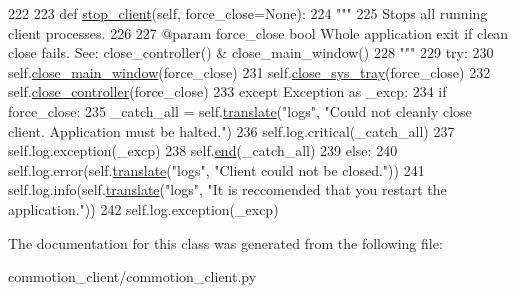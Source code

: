 \begin{DoxyCode}
222 
223     \textcolor{keyword}{def }\hyperlink{classcommotion__client_1_1commotion__client_1_1CommotionClientApplication_a63104a06ba20d9b679c22b542fd90c94}{stop\_client}(self, force\_close=None):
224         \textcolor{stringliteral}{"""}
225 \textcolor{stringliteral}{        Stops all running client processes.}
226 \textcolor{stringliteral}{}
227 \textcolor{stringliteral}{        @param force\_close bool Whole application exit if clean close fails. See: close\_controller() &
       close\_main\_window()}
228 \textcolor{stringliteral}{        """}
229         \textcolor{keywordflow}{try}:
230             self.\hyperlink{classcommotion__client_1_1commotion__client_1_1CommotionClientApplication_ac3f5efd893879314eb1fbcf7e4d90192}{close\_main\_window}(force\_close)
231             self.\hyperlink{classcommotion__client_1_1commotion__client_1_1CommotionClientApplication_a2a0f0cfc9ca6a62a2aaa90bdc8bca1fc}{close\_sys\_tray}(force\_close)
232             self.\hyperlink{classcommotion__client_1_1commotion__client_1_1CommotionClientApplication_aa35cc13c36cfa90d6ac3de6db56e5fc4}{close\_controller}(force\_close)
233         \textcolor{keywordflow}{except} Exception \textcolor{keyword}{as} \_excp:
234             \textcolor{keywordflow}{if} force\_close:
235                 \_catch\_all = self.\hyperlink{classcommotion__client_1_1commotion__client_1_1CommotionClientApplication_a57e951c9b241fb0e0c70055b4ca1b6f7}{translate}(\textcolor{stringliteral}{"logs"}, \textcolor{stringliteral}{"Could not cleanly close client. Application
       must be halted."})
236                 self.log.critical(\_catch\_all)
237                 self.log.exception(\_excp)
238                 self.\hyperlink{classcommotion__client_1_1commotion__client_1_1CommotionClientApplication_af2043aac2ebc25f55b73ec317d6ea463}{end}(\_catch\_all)
239             \textcolor{keywordflow}{else}:
240                 self.log.error(self.\hyperlink{classcommotion__client_1_1commotion__client_1_1CommotionClientApplication_a57e951c9b241fb0e0c70055b4ca1b6f7}{translate}(\textcolor{stringliteral}{"logs"}, \textcolor{stringliteral}{"Client could not be closed."}))
241                 self.log.info(self.\hyperlink{classcommotion__client_1_1commotion__client_1_1CommotionClientApplication_a57e951c9b241fb0e0c70055b4ca1b6f7}{translate}(\textcolor{stringliteral}{"logs"}, \textcolor{stringliteral}{"It is reccomended that you restart the
       application."}))
242                 self.log.exception(\_excp)

\end{DoxyCode}


The documentation for this class was generated from the following file\-:\begin{DoxyCompactItemize}
\item 
commotion\-\_\-client/commotion\-\_\-client.\-py\end{DoxyCompactItemize}
